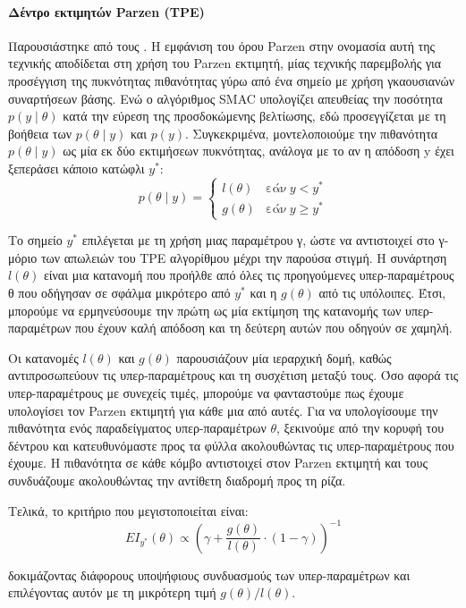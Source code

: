  \paragraph{Δέντρο εκτιμητών Parzen (TPE)}
 Παρουσιάστηκε από τους \citet{Bergstra:2011:AHO:2986459.2986743}. H εμφάνιση του όρου Parzen στην ονομασία αυτή της τεχνικής αποδίδεται στη χρήση του Parzen εκτιμητή, μίας τεχνικής παρεμβολής για προσέγγιση της πυκνότητας πιθανότητας γύρω από ένα σημείο με χρήση γκαουσιανών συναρτήσεων βάσης. Ενώ ο αλγόριθμος SMAC υπολογίζει απευθείας την ποσότητα $p(y \mid \theta)$ κατά την εύρεση της προσδοκώμενης βελτίωσης, εδώ προσεγγίζεται με τη βοήθεια των  $p(\theta \mid y)$ και $ p(y)$. Συγκεκριμένα, μοντελοποιούμε την πιθανότητα $p(\theta \mid y)$ ως μία εκ δύο εκτιμήσεων πυκνότητας, ανάλογα με το αν η απόδοση y έχει ξεπεράσει κάποιο κατώφλι $y^*$:
 $$p(\theta \mid y)=\left\{
 \begin{array}{ll}
 l(\theta)  & \mbox{εάν} \> y < y^* \\
 g(\theta)  & \mbox{εάν} \> y \geq y^*
 \end{array}
 \right.$$
 
 Το σημείο $y^*$ επιλέγεται με τη χρήση μιας παραμέτρου γ, ώστε να αντιστοιχεί στο γ-μόριο των απωλειών του TPE αλγορίθμου μέχρι την παρούσα στιγμή. Η συνάρτηση $l(\theta)$ είναι μια κατανομή που προήλθε από όλες τις προηγούμενες υπερ-παραμέτρους θ που οδήγησαν σε σφάλμα μικρότερο από $y^*$ και η $g(\theta)$ από τις υπόλοιπες. Έτσι, μπορούμε να ερμηνεύσουμε την πρώτη ως μία εκτίμηση της κατανομής των υπερ-παραμέτρων που έχουν καλή απόδοση και τη δεύτερη αυτών που οδηγούν σε χαμηλή.
 
 Οι κατανομές $l(\theta)$ και $g(\theta)$ παρουσιάζουν μία ιεραρχική δομή, καθώς αντιπροσωπεύουν τις υπερ-παραμέτρους και τη συσχέτιση μεταξύ τους. Όσο αφορά τις υπερ-παραμέτρους με συνεχείς τιμές, μπορούμε να φανταστούμε πως έχουμε  υπολογίσει τον Parzen εκτιμητή για κάθε μια από αυτές. Για να υπολογίσουμε την πιθανότητα ενός παραδείγματος υπερ-παραμέτρων $\theta$, ξεκινούμε από την κορυφή του δέντρου και κατευθυνόμαστε προς τα φύλλα ακολουθώντας τις υπερ-παραμέτρους που έχουμε. Η πιθανότητα σε κάθε κόμβο αντιστοιχεί στον Parzen εκτιμητή και τους συνδυάζουμε ακολουθώντας την αντίθετη διαδρομή προς τη ρίζα.
 
 Τελικά, το κριτήριο που μεγιστοποιείται είναι:
 $$EI_{y^{*}}(\theta) \propto (\gamma + \frac{g(\theta)}{l(\theta)} \cdot (1- \gamma))^{-1}  $$
 
 δοκιμάζοντας διάφορους υποψήφιους συνδυασμούς των υπερ-παραμέτρων και επιλέγοντας αυτόν με τη μικρότερη τιμή $g(\theta)/l(\theta)$.
 
